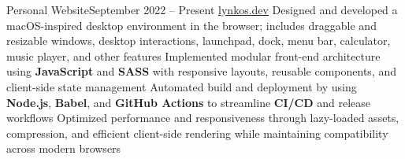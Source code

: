 
\subheading
    {Personal Website}{September 2022 -- Present}
    {\href{https://lynkos.dev}{lynkos.dev}}{}
    \itemListStart
    \listItem{}
        {Designed and developed a macOS-inspired desktop environment in the browser; includes draggable and resizable windows, desktop interactions, launchpad, dock, menu bar, calculator, music player, and other features}
    \listItem{}
        {Implemented modular front-end architecture using \textbf{JavaScript} and \textbf{SASS} with responsive layouts, reusable components, and client-side state management} %
    \listItem{}
        {Automated build and deployment by using \textbf{Node.js}, \textbf{Babel}, and \textbf{GitHub Actions} to streamline \textbf{CI/CD} and release workflows}
    \listItem{}
        {Optimized performance and responsiveness through lazy-loaded assets, compression, and efficient client-side rendering while maintaining compatibility across modern browsers}
    \itemListEnd


